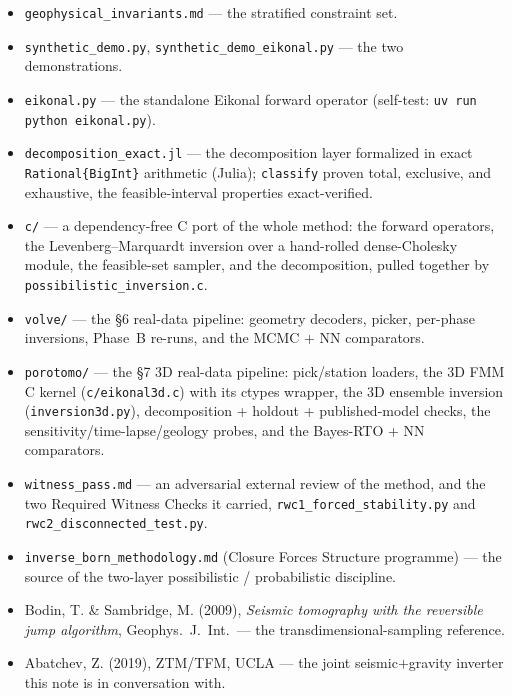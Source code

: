 \documentclass[11pt]{article}
\newcommand{\file}[1]{\texttt{#1}}
\begin{document}
\begin{itemize}
\item \file{geophysical\_invariants.md} --- the stratified constraint set.
\item \file{synthetic\_demo.py}, \file{synthetic\_demo\_eikonal.py} --- the two
  demonstrations.
\item \file{eikonal.py} --- the standalone Eikonal forward operator (self-test:
  \file{uv run python eikonal.py}).
\item \file{decomposition\_exact.jl} --- the decomposition layer formalized in
  exact \texttt{Rational\{BigInt\}} arithmetic (Julia); \file{classify} proven
  total, exclusive, and exhaustive, the feasible-interval properties
  exact-verified.
\item \file{c/} --- a dependency-free C port of the whole method: the forward
  operators, the Levenberg--Marquardt inversion over a hand-rolled
  dense-Cholesky module, the feasible-set sampler, and the decomposition,
  pulled together by \file{possibilistic\_inversion.c}.
\item \file{volve/} --- the \S6 real-data pipeline: geometry decoders,
  picker, per-phase inversions, Phase~B re-runs, and the MCMC + NN
  comparators.
\item \file{porotomo/} --- the \S7 3D real-data pipeline: pick/station
  loaders, the 3D FMM C kernel (\file{c/eikonal3d.c}) with its ctypes
  wrapper, the 3D ensemble inversion (\file{inversion3d.py}),
  decomposition + holdout + published-model checks, the
  sensitivity/time-lapse/geology probes, and the Bayes-RTO + NN
  comparators.
\item \file{witness\_pass.md} --- an adversarial external review of the
  method, and the two Required Witness Checks it carried,
  \file{rwc1\_forced\_stability.py} and
  \file{rwc2\_disconnected\_test.py}.
\item \file{inverse\_born\_methodology.md} (Closure Forces Structure
  programme) --- the source of the two-layer possibilistic / probabilistic
  discipline.
\item Bodin, T. \& Sambridge, M. (2009), \emph{Seismic tomography with the
  reversible jump algorithm}, Geophys.\ J.\ Int.\ --- the
  transdimensional-sampling reference.
\item Abatchev, Z. (2019), ZTM/TFM, UCLA --- the joint seismic$+$gravity
  inverter this note is in conversation with.
\end{itemize}
\end{document}
